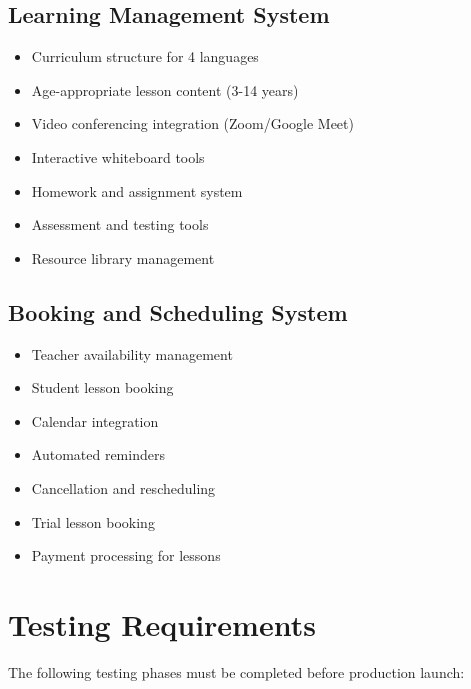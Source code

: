 \documentclass[11pt,a4paper]{article}
\begin{document}
\subsection{Learning Management System}
\begin{itemize}[leftmargin=*]
    \item Curriculum structure for 4 languages
    \item Age-appropriate lesson content (3-14 years)
    \item Video conferencing integration (Zoom/Google Meet)
    \item Interactive whiteboard tools
    \item Homework and assignment system
    \item Assessment and testing tools
    \item Resource library management
\end{itemize}

\subsection{Booking and Scheduling System}
\begin{itemize}[leftmargin=*]
    \item Teacher availability management
    \item Student lesson booking
    \item Calendar integration
    \item Automated reminders
    \item Cancellation and rescheduling
    \item Trial lesson booking
    \item Payment processing for lessons
\end{itemize}

\section{Testing Requirements}

\begin{tcolorbox}[colback=yellow!10, colframe=orange, title=\textbf{Testing Still Required}]
The following testing phases must be completed before production launch:
\end{tcolorbox}
\end{document}
